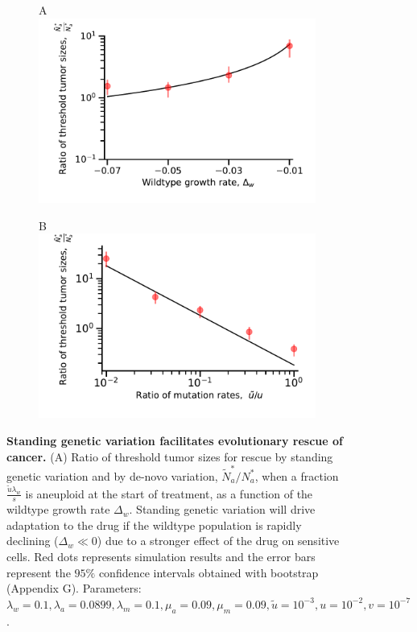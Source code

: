 \documentclass[12pt]{extarticle}
\begin{document}
\begin{figure}
\begin{subfigure}{0.5\textwidth}
A\\
\includegraphics[width=1\textwidth]{Figures/RatiodwPlot.pdf}
\end{subfigure}
\begin{subfigure}{0.5\textwidth}
B\\
\includegraphics[width=1\textwidth]{Figures/ratio_uPlot.pdf}
\end{subfigure}
\caption{
\textbf{Standing genetic variation facilitates evolutionary rescue of cancer.}
(A)  Ratio of threshold tumor sizes for rescue by standing genetic variation and by de-novo variation, $\tilde{N}_a^*/N_a^*$, when a fraction $\frac{\tilde{u}\lambda_w}{s}$ is aneuploid at the start of treatment, as a function of the wildtype growth rate $\Delta_w$.  Standing genetic variation will drive adaptation to the drug if the wildtype population is rapidly declining ($\Delta_w\ll0$) due to a stronger effect of the drug on sensitive cells. Red dots represents simulation results and the error bars represent the $95\%$ confidence intervals obtained with bootstrap (Appendix G). Parameters: $\lambda_w=0.1,\lambda_a=0.0899,\lambda_m=0.1,\mu_a=0.09,\mu_m=0.09,\tilde{u}=10^{-3},u=10^{-2}, v=10^{-7}$.
}
\end{figure}
\end{document}
